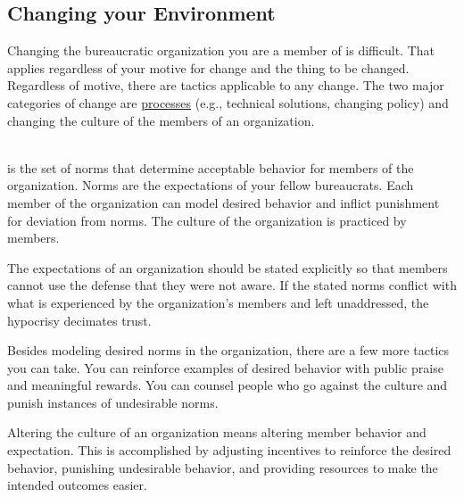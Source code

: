 \subsection*{Changing your Environment}


Changing the bureaucratic organization you are a member of is difficult. That applies regardless of your motive for change and the thing to be changed. Regardless of motive, there are tactics applicable to any change. 
The two major categories of change are 
%
\hyperref[sec:change-a-process]{processes} (e.g., technical solutions, changing policy)
and changing the \gls{culture} of the members of an organization.

\ \\

\iftoggle{glossarysubstitutionworks}{\Gls{culture}}{Culture} is the set of norms that determine acceptable behavior for members of the organization. Norms are the expectations of your fellow bureaucrats. Each member of the organization can model desired behavior and inflict punishment for deviation from norms. The culture of the organization is practiced by members. 

The expectations of an organization should be stated explicitly so that members cannot use the defense that they were not aware. If the stated norms conflict with what is experienced by the organization's members and left unaddressed, the hypocrisy decimates trust. 

Besides modeling desired norms in the organization, there are a few more tactics you can take. 
You can reinforce examples of desired behavior with public praise and meaningful rewards. You can counsel people who go against the culture and punish instances of undesirable norms. 

Altering the culture of an organization means altering member behavior and expectation. This is accomplished by adjusting incentives to reinforce the desired behavior, punishing undesirable behavior, and providing resources to make the intended outcomes easier. 

